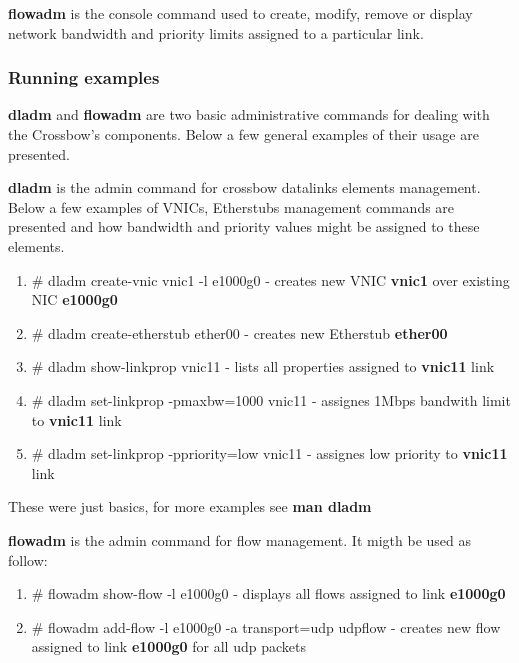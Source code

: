 \documentclass[11pt]{book}
\begin{document}

        \medskip

        \textbf{flowadm} is the console command used to create, modify, remove or display network bandwidth and priority
        limits assigned to a particular link. 


      \subsubsection{Running examples}

        \textbf{dladm} and \textbf{flowadm} are two basic administrative commands for dealing with the Crossbow's
        components. Below a few general examples of their usage are presented.

        \textbf{dladm} is the admin command for crossbow datalinks elements management. Below a few
        examples of VNICs, Etherstubs management commands are presented and how bandwidth and priority
        values might be assigned to these elements.

        \begin{enumerate}
          \item{\# dladm create-vnic vnic1 -l e1000g0 - creates new VNIC \textbf{vnic1} over existing NIC \textbf{e1000g0}}
          \item{\# dladm create-etherstub ether00 - creates new Etherstub \textbf{ether00}}
          \item{\# dladm show-linkprop vnic11 - lists all properties assigned to \textbf{vnic11} link}
          \item{\# dladm set-linkprop -pmaxbw=1000 vnic11 - assignes 1Mbps bandwith limit to \textbf{vnic11} link}
          \item{\# dladm set-linkprop -ppriority=low vnic11 - assignes low priority to \textbf{vnic11} link}
        \end{enumerate}

        These were just basics, for more examples see \textbf{man dladm}

        \medskip

        \textbf{flowadm} is the admin command for flow management. It migth be used as follow:     

        \begin{enumerate}
                \item{\# flowadm show-flow -l e1000g0 - displays all flows assigned to link \textbf{e1000g0}}
                \item{\# flowadm add-flow -l e1000g0 -a transport=udp udpflow - creates new flow assigned to link \textbf{e1000g0} for all udp packets}
        \end{enumerate}
\end{document}
